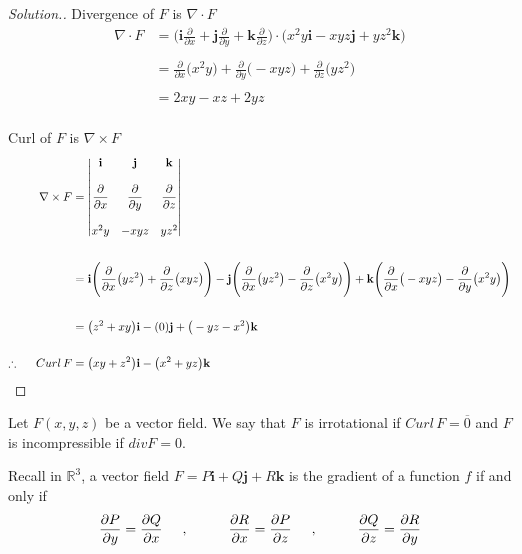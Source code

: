 \documentclass[11pt,a4paper]{article}
\theoremstyle{definition}
\newenvironment{solution}
  {\renewcommand{\qedsymbol}{}\begin{proof}[\textit{Solution}.]}
  {\end{proof}}
\begin{document}
\begin{solution}
Divergence of $F$ is $\nabla\cdot F$
\begin{align*}
\nabla\cdot F & = \Bigg(\textbf{i}\frac{\partial}{\partial x} + \textbf{j}\frac{\partial}{\partial y} +\textbf{k} \frac{\partial}{\partial z}\Bigg) \cdot \big(x^2y\textbf{i} - xyz\textbf{j} + yz^2\textbf{k}\big)\\\\
& = \frac{\partial}{\partial x}\big(x^2y\big) + \frac{\partial}{\partial y}\big(-xyz\big) + \frac{\partial}{\partial z}\big(yz^2\big)\\\\
& = 2xy - xz + 2yz\\
\end{align*}

Curl of $F$ is $\nabla\times F$
\begin{align*}
\nabla \times F & = 
\begin{vmatrix}
\textbf{i} & \textbf{j} & \textbf{k}\\\\
\dfrac{\partial}{\partial x} & \dfrac{\partial}{\partial y} & \dfrac{\partial}{\partial z}\\\\
x^2y & -xyz & yz^2\\
\end{vmatrix}\\\\
& = \textbf{i}\Bigg(\frac{\partial}{\partial x}\big(yz^2\big) + \frac{\partial}{\partial z}\big(xyz\big)\Bigg)-\textbf{j}\Bigg(\frac{\partial}{\partial x}\big(yz^2\big) - \frac{\partial}{\partial z}\big(x^2y\big) \Bigg) + \textbf{k}\Bigg(\frac{\partial}{\partial x}\big(-xyz\big) - \frac{\partial}{\partial y}\big(x^2y\big)\Bigg)\\\\
& = \big(z^2+xy\big)\textbf{i} - (0)\textbf{j} + \big(-yz-x^2\big)\textbf{k}\\\\
\therefore \hspace{0.5cm} Curl\, F & = \big(xy+z^2\big)\textbf{i} -\big(x^2+yz\big)\textbf{k}\\
\end{align*}
\end{solution}

Let $F(x,y,z)$ be a vector field. We say that $F$ is irrotational if $Curl\, F = \overline{0}$ and $F$ is incompressible if $div F =0$.


Recall in $\mathbb{R}^3$, a vector field $F=P\textbf{i} + Q\textbf{j} + R\textbf{k}$ is the gradient of a function $f$ if and only if
$$\frac{\partial P}{\partial y} = \frac{\partial Q}{\partial x}\hspace{0.5cm} ,\hspace{1cm} \frac{\partial R}{\partial x} = \frac{\partial P}{\partial z}\hspace{0.5cm} , \hspace{1cm} \frac{\partial Q}{\partial z} = \frac{\partial R}{\partial y}$$
\end{document}
